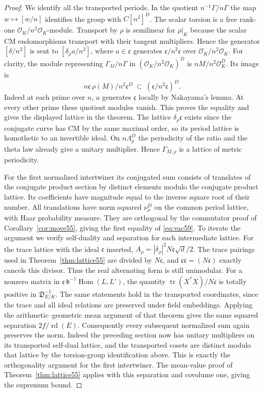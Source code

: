 \documentclass[a4paper,11pt]{article}
\theoremstyle{definition}
\theoremstyle{remark}
\numberwithin{equation}{section}
\newcommand{\OO}{\mathcal O}
\begin{document}
\begin{proof}
We identify all the transported periods. In the quotient
\(n^{-1}\Gamma/n\Gamma\) the map \(w\mapsto[w/n]\) identifies
the group with \(C[n^2]^D\). The scalar torsion
is a free rank-one \(\OO_K/n^2\OO_K\)-module. Transport by
\(\rho\) is semilinear for \(\rho|_K\) because the scalar CM
endomorphisms transport with their tangent multipliers. Hence
the generator \([\delta/n^2]\) is sent to
\([\delta_\rho a/n^2]\), where
\(a\in\mathfrak c\) generates
\(\mathfrak c/n^2\mathfrak c\) over \(\OO_K/n^2\OO_K\).
For clarity, the module representing \(\Gamma_M/n\Gamma\) in
\((\OO_K/n^2\OO_K)^D\) is \(nM/n^2\OO_K^D\).
Its image is
\[
       n\mathfrak c\,\rho(M)/n^2\mathfrak c^D
                       \ \subset\ (\mathfrak c/n^2\mathfrak c)^D .
\]
Indeed at each prime over \(n\), \(a\) generates
\(\mathfrak c\) locally by Nakayama's lemma. At every other
prime these quotient modules vanish. This proves the equality
and gives the displayed lattice in the theorem. The lattice
\(\delta_\rho\mathfrak c\) exists since the conjugate curve has
CM by the same maximal order, so its period lattice is homothetic
to an invertible ideal. On \(n\Lambda_\rho^D\) the periodicity of
the ratio and the theta law already give a unitary multiplier.
Hence \(\Gamma_{M,\rho}\) is a lattice of metric periodicity.

For the first normalized intertwiner its conjugated sum consists
of translates of the conjugate product section by distinct
elements modulo the conjugate product lattice. Its coefficients
have magnitude equal to the inverse square root of their number.
All translations have norm squared \(\nu_\rho^D\) on the common
period lattice, with Haar probability measure. They are orthogonal
by the commutator proof of Corollary~\ref{cor:move55}, giving
the first equality of \eqref{eq:vac59}. To iterate the argument
we verify self-duality and separation for each intermediate
lattice. For the trace lattice with the ideal \(\mathfrak c\)
inserted, \(A_\rho=|\delta_\rho|^2 N\mathfrak c\sqrt d/2\).
The trace pairings used in Theorem~\ref{thm:lattice55} are divided
by \(N\mathfrak c\), and
\(\mathfrak c\overline{\mathfrak c}=(N\mathfrak c)\) exactly
cancels this divisor. Thus the real alternating form is still
unimodular. For a nonzero matrix in
\(\mathfrak c\,\mathfrak b^{-1}\operatorname{Hom}(L,L')\), the
quantity \(\operatorname{tr}(X^*X)/N\mathfrak c\) is totally
positive in \(\mathfrak D_{E/K}^{-1}\). The same statements
hold in the transported coordinates, since the trace and all
ideal relations are preserved under field embeddings. Applying
the arithmetic--geometric mean argument of that theorem gives
the same squared separation \(2f/\operatorname{rd}(E)\).
Consequently every subsequent normalized sum again preserves
the norm. Indeed the preceding section now has unitary
multipliers on its transported self-dual lattice, and the
transported cosets are distinct modulo that lattice by the
torsion-group identification above. This is exactly the
orthogonality argument for the first intertwiner. The
mean-value proof of Theorem~\ref{thm:lattice55} applies with
this separation and covolume one, giving the supremum bound.
\end{proof}
\end{document}
